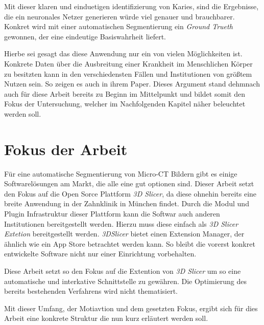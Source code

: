 Mit dieser klaren und einduetigen identifizierung von Karies, sind die Ergebnisse,
die ein neuronales Netzer generieren würde viel genauer und brauchbarer. Konkret
wird mit einer automatischen Segmentierung ein \textit{Ground Trueth} gewonnen, der
eine eindeutige Basiswahrheit liefert.

Hierbe sei gesagt das diese Anwendung nur ein von vielen Möglichkeiten ist.
Konkrete Daten über die Ausbreitung einer Krankheit im Menschlichen Körper zu
besitzten kann in den verschiedensten Fällen und Institutionen von größtem
Nutzen sein. So zeigen es auch \citet{de20083d} in ihrem Paper. Dieses Argument stand
dehmnach auch für diese Arbeit bereits zu Beginn im Mittelpunkt und bildet somit
den Fokus der Untersuchung, welcher im Nachfolgenden Kapitel näher beleuchtet
werden soll.

\section{Fokus der Arbeit}
\label{sec:fokus_der-arbeit} Für eine automatische Segmentierung von Micro-CT
Bildern gibt es einige Softwarelösungen am Markt, die alle eine gut optionen sind.
Dieser Arbeit setzt den Fokus auf die Open Sorce Plattform \textit{3D Slicer},
da diese ohnehin bereits eine breite Anwendung in der Zahnklinik in München
findet. Durch die Modul und Plugin Infrastruktur dieser Plattform kann die Softwar
auch anderen Institutionen bereitgestellt werden. Hierzu muss diese einfach als
\textit{3D Slicer Extetion} bereitgestellt werden. \textit{3DSlicer} bietet einen
Extension Manager, der ähnlich wie ein App Store betrachtet werden kann. So bleibt
die vorerst konkret entwickelte Software nicht nur einer Einrichtung vorbehalten.

Diese Arbeit setzt so den Fokus auf die Extention von \textit{3D Slicer} um so
eine automatische und interkative Schnittstelle zu gewähren. Die Optimierung des
bereits bestehenden Verfahrens wird nicht thematisiert.

Mit dieser Umfang, der Motiavtion und dem gesetzten Fokus, ergibt sich für dies Arbeit
eine konkrete Struktur die nun kurz erläutert werden soll.

